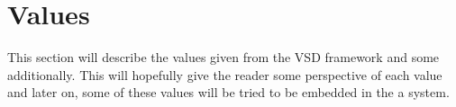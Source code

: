 \section{Values}
This section will describe the values given from the VSD framework and some additionally. This will hopefully give the reader some perspective of each value and later on, some of these values will be tried to be embedded in the a system. 